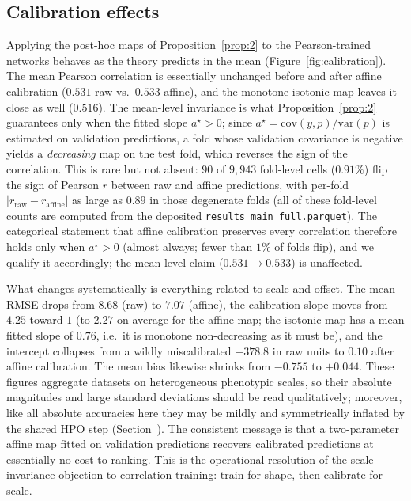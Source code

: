 \subsection{Calibration effects}\label{sec:res-calibration}
Applying the post-hoc maps of Proposition~\ref{prop:2} to the Pearson-trained
networks behaves as the theory predicts in the mean (Figure~\ref{fig:calibration}).
The mean Pearson correlation is essentially unchanged before and after affine
calibration ($0.531$ raw vs.\ $0.533$ affine), and the monotone isotonic map
leaves it close as well ($0.516$). The mean-level invariance is what
Proposition~\ref{prop:2} guarantees only when the fitted slope $a^\star>0$; since
$a^\star=\mathrm{cov}(y,p)/\mathrm{var}(p)$ is estimated on validation
predictions, a fold whose validation covariance is negative yields a
\emph{decreasing} map on the test fold, which reverses the sign of the
correlation. This is rare but not absent: $90$ of $9{,}943$ fold-level cells
($0.91\%$) flip the sign of Pearson $r$ between raw and affine predictions, with
per-fold $|r_{\mathrm{raw}}-r_{\mathrm{affine}}|$ as large as $0.89$ in those
degenerate folds (all of these fold-level counts are computed from the deposited
\texttt{results\_main\_full.parquet}). The categorical statement that affine calibration preserves
every correlation therefore holds only when $a^\star>0$ (almost always; fewer than
$1\%$ of folds flip), and we qualify it accordingly; the mean-level claim
($0.531\!\to\!0.533$) is unaffected.

What changes systematically is everything related to scale and offset. The mean
RMSE drops from $8.68$ (raw) to $7.07$ (affine), the calibration slope moves from
$4.25$ toward $1$ (to $2.27$ on average for the affine map; the isotonic map has
a mean fitted slope of $0.76$, i.e.\ it is monotone non-decreasing as it must be),
and the intercept collapses from a wildly miscalibrated $-378.8$ in raw units to
$0.10$ after affine calibration. The mean bias likewise shrinks from $-0.755$ to
$+0.044$. These figures aggregate datasets on heterogeneous phenotypic scales, so
their absolute magnitudes and large standard deviations should be read
qualitatively; moreover, like all absolute accuracies here they may be mildly and
symmetrically inflated by the shared HPO step (Section~). The
consistent message is that a two-parameter affine map fitted on validation
predictions recovers calibrated predictions at essentially no cost to ranking.
This is the operational resolution of the scale-invariance objection to
correlation training: train for shape, then calibrate for scale.

